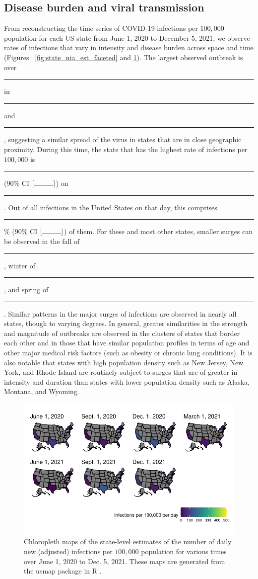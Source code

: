 \documentclass{article}
\begin{document}
\subsection{Disease burden and viral transmission}
From reconstructing the time series of COVID-19 infections per $100,000$ population for each US state from June 1, 2020 to December 5, 2021, we observe rates of infections that vary in intensity and disease burden across space and time (Figures ~\ref{fig:state_nia_est_faceted} and \ref{fig:chloro_inf_rates}). The largest observed outbreak is over \rule{1cm}{0.15mm} in \rule{1cm}{0.15mm} and \rule{1cm}{0.15mm}, suggesting a similar spread of the virus in states that are in close geographic proximity. During this time, the state that has the highest rate of infections per $100,000$ is \rule{1cm}{0.15mm} ($90\%$ CI $[\rule{1cm}{0.15mm}]$) on \rule{1cm}{0.15mm}. Out of all infections in the United States on that day, this comprises \rule{1cm}{0.15mm}\% ($90\%$ CI $[\rule{1cm}{0.15mm}]$) of them. For these and most other states, smaller surges can be observed in the fall of \rule{1cm}{0.15mm}, winter of \rule{1cm}{0.15mm}, and spring of \rule{1cm}{0.15mm}. Similar patterns in the major surges of infections are observed in nearly all states, though to varying degrees. In general, greater similarities in the strength and magnitude of outbreaks are observed in the clusters of states that border each other and in those that have similar population profiles in terms of age and other major medical risk factors (such as obesity or chronic lung conditions). It is also notable that states with high population density such as New Jersey, New York, and Rhode Island are routinely subject to surges that are of greater in intensity and duration than states with lower population density such as Alaska, Montana, and Wyoming. %

\begin{figure}[!tb]
\centering
    \includegraphics[width=.99\textwidth]{chloro_inf_rates.pdf}
    \caption{Chloropleth maps of the state-level estimates of the number of daily new (adjusted) infections per $100,000$ population for various times over June 1, 2020 to Dec. 5, 2021. These maps are generated from the usmap package in R \citep{lorenzo2023usmap}.} 
    \label{fig:chloro_inf_rates}
\end{figure}
\end{document}

